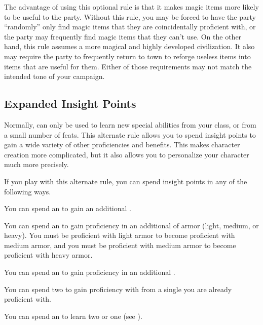         The advantage of using this optional rule is that it makes magic items more likely to be useful to the party.
        Without this rule, you may be forced to have the party ``randomly'' only find magic items that they are coincidentally proficient with, or the party may frequently find magic items that they can't use.
        On the other hand, this rule assumes a more magical and highly developed civilization.
        It also may require the party to frequently return to town to reforge useless items into items that are useful for them.
        Either of those requirements may not match the intended tone of your campaign.

    \subsection{Expanded Insight Points}
        Normally,  can only be used to learn new special abilities from your class, or from a small number of feats.
        This alternate rule allows you to spend insight points to gain a wide variety of other proficiencies and benefits.
        This makes character creation more complicated, but it also allows you to personalize your character much more precisely.

        If you play with this alternate rule, you can spend insight points in any of the following ways.
        \begin{raggeditemize}
            \item You can spend an  to gain an additional .
            \item You can spend an  to gain proficiency in an additional  of armor (light, medium, or heavy).
                You must be proficient with light armor to become proficient with medium armor, and you must be proficient with medium armor to become proficient with heavy armor.
            \item You can spend an  to gain proficiency in an additional .
            \item You can spend two  to gain proficiency with  from a single  you are already proficient with.
            \item You can spend an  to learn two  or one  (see ).
        \end{raggeditemize}


